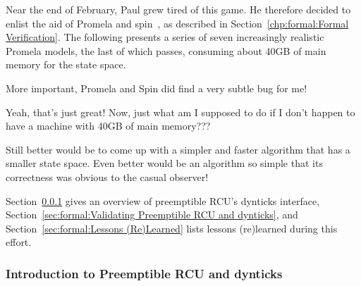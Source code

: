 Near the end of February, Paul grew tired of this game.
He therefore decided to enlist the aid of
Promela and spin~\cite{Holzmann03a}, as described in
Section~\ref{chp:formal:Formal Verification}.
The following presents a series of seven increasingly realistic
Promela models, the last of which passes, consuming about
40GB of main memory for the state space.

More important, Promela and Spin did find a very subtle bug for me!

\QuickQuiz{}
	Yeah, that's just great!
	Now, just what am I supposed to do if I don't happen to have a
	machine with 40GB of main memory???
 \QuickQuizEnd

Still better would be to come up with a simpler and faster algorithm
that has a smaller state space.
Even better would be an algorithm so simple that its correctness was
obvious to the casual observer!

Section~\ref{sec:formal:Introduction to Preemptible RCU and dynticks}
gives an overview of preemptible RCU's dynticks interface,
Section~\ref{sec:formal:Validating Preemptible RCU and dynticks},
and
Section~\ref{sec:formal:Lessons (Re)Learned} lists
lessons (re)learned during this effort.

\subsubsection{Introduction to Preemptible RCU and dynticks}
\label{sec:formal:Introduction to Preemptible RCU and dynticks}

